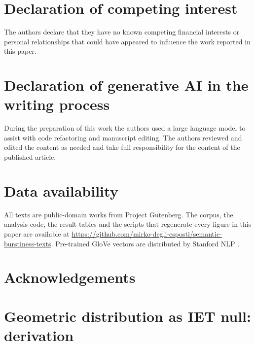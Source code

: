 \documentclass[preprint]{elsarticle}
\begin{document}
\section*{Declaration of competing interest}
The authors declare that they have no known competing financial
interests or personal relationships that could have appeared to
influence the work reported in this paper.
 
\section*{Declaration of generative AI in the writing process}
During the preparation of this work the authors used a large language
model to assist with code refactoring and manuscript editing. The
authors reviewed and edited the content as needed and take full
responsibility for the content of the published article.
 
\section*{Data availability}
All texts are public-domain works from Project Gutenberg. The corpus,
the analysis code, the result tables and the scripts that regenerate
every figure in this paper are available at
\url{https://github.com/mirko-degli-esposti/semantic-burstiness-texts}.
Pre-trained GloVe vectors are distributed by Stanford NLP
\citep{Pennington2014}.


\section*{Acknowledgements}
\appendix

\section{Geometric distribution as IET null: derivation}
\label{app:geometric}
\end{document}

